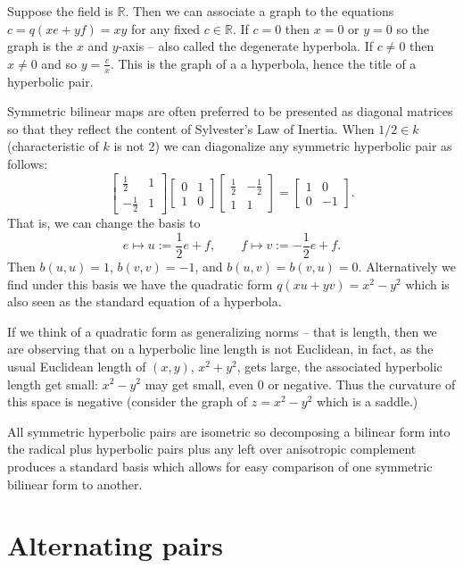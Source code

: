 \documentclass[12pt]{article}
\begin{document}
Suppose the field is $\mathbb{R}$.  Then we can associate a graph to the
equations $c=q(xe+yf)=xy$ for any fixed $c\in \mathbb{R}$.  If $c=0$ then
$x=0$ or $y=0$ so the graph is the $x$ and $y$-axis -- also called the
degenerate hyperbola.  If $c\neq 0$ then $x\neq 0$ and so $y=\frac{c}{x}$.
This is the graph of a a hyperbola, hence the title of a hyperbolic pair.

Symmetric bilinear maps are often preferred to be presented as diagonal
matrices so that they reflect the content of Sylvester's Law of Inertia.
When $1/2\in k$ (characteristic of $k$ is not 2) we can 
diagonalize any symmetric hyperbolic pair as follows:
\[\begin{bmatrix} \frac{1}{2} & 1 \\ -\frac{1}{2} & 1\end{bmatrix}
\begin{bmatrix} 0 & 1\\ 1 & 0 \end{bmatrix}
\begin{bmatrix} \frac{1}{2} & -\frac{1}{2}\\ 1 & 1\end{bmatrix}
=\begin{bmatrix} 1 & 0\\ 0 & -1\end{bmatrix}.\]
That is, we can change the basis to
\[e\mapsto u:=\frac{1}{2}e+f,\qquad f\mapsto v:=-\frac{1}{2}e+f.\]
Then $b(u,u)=1$, $b(v,v)=-1$, and $b(u,v)=b(v,u)=0$.  Alternatively we find 
under this basis we have the quadratic form $q(xu+yv)=x^2-y^2$ which is also
seen as the standard equation of a hyperbola.

If we think of a quadratic form as generalizing norms -- that is length, then
we are observing that on a hyperbolic line length is not Euclidean, in fact, 
as the usual Euclidean length of $(x,y)$, $x^2+y^2$, gets large, the associated hyperbolic length get small: $x^2-y^2$ may get small, even 0 or negative.  Thus the curvature of this space is negative (consider the graph of $z=x^2-y^2$ which is a saddle.)

All symmetric hyperbolic pairs are isometric so decomposing a bilinear form into
the radical plus hyperbolic pairs plus any left over anisotropic complement produces 
a standard basis which allows for easy comparison of one symmetric bilinear form to another.

\section{Alternating pairs}
\end{document}
